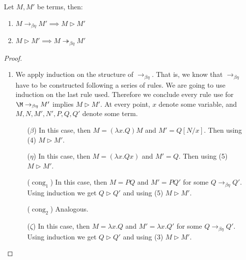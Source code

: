 \begin{lemma}\label{lemma:cr1}
  Let $M,M'$ be terms, then:
  \begin{enumerate}
  \item $M\to_{\beta\eta} M'\implies M \triangleright M'$
  \item $M\triangleright M'\implies M \twoheadrightarrow_{\beta\eta} M'$
  \end{enumerate}
\end{lemma}
\begin{proof}
  \begin{enumerate}
  \item  We  apply induction on the structure of $\to_{\beta\eta}$. That is, we know that $\to_{\beta\eta}$ have to be constructed following a series of rules. We are going to use induction on the last rule used. Therefore we conclude  every rule use for $\M \to_{\beta\eta} M'$ implies $M \triangleright M'$. At every point, $x$ denote some variable, and $M,N,M',N',P,Q,Q'$ denote some term.

    \begin{itemize}
    \item[($\beta$)] In this case, then $M=(\lambda x.Q)M$ and $M' = Q[N/x]$. Then using (4) $M \triangleright M'$.
    \item[($\eta$)] In this case, then $M=(\lambda x.Qx)$ and $M' = Q$. Then using (5) $M \triangleright M'$.
    \item[($\operatorname{cong}_1$)] In this case, then $M=PQ$ and $M' = PQ'$ for some $Q\to_{\beta\eta} Q'$. Using induction we get $Q\triangleright Q'$ and using (5) $M \triangleright M'$. 
    \item[($\operatorname{cong}_2$)]  Analogous.
    \item[($\zeta$)] In this case, then $M=\lambda x.Q$ and $M' = \lambda x.Q'$ for some $Q\to_{\beta\eta} Q'$. Using induction we get $Q\triangleright Q'$ and using (3) $M \triangleright M'$.  
    \end{itemize}


\end{enumerate}
\end{proof}
